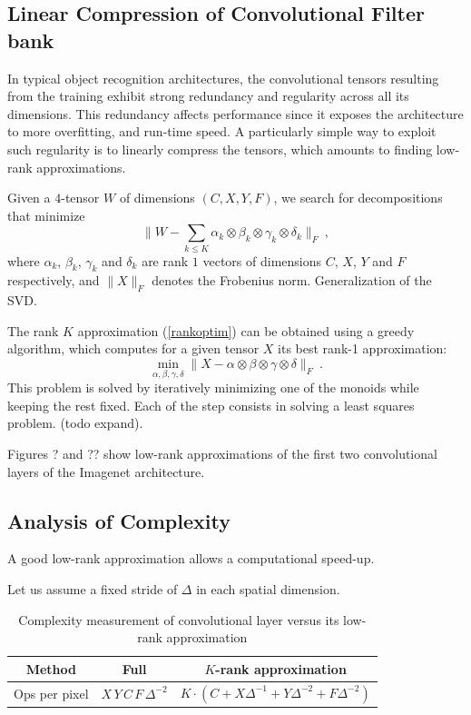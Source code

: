 \documentclass{article}
\begin{document}
\subsection{Linear Compression of Convolutional Filter bank}

In typical object recognition architectures, the convolutional tensors resulting
from the training exhibit strong redundancy and regularity across all its 
dimensions. This redundancy affects performance since it exposes
the architecture to more overfitting, and run-time speed. 
A particularly simple way to exploit such regularity is to 
linearly compress the tensors, which amounts to finding low-rank 
approximations.

Given a $4$-tensor $W$ of dimensions $(C,X,Y,F)$, we search for decompositions 
that minimize 
\begin{equation}
\label{rankoptim}
\| W - \sum_{k\leq K} \alpha_k \otimes \beta_k \otimes \gamma_k \otimes \delta_k\|_F~,
\end{equation}
where $\alpha_k$, $\beta_k$, $\gamma_k$ and $\delta_k$ are 
rank $1$ vectors of dimensions $C$, $X$, $Y$ and $F$ respectively, and
$\| X \|_F$ denotes the Frobenius norm. Generalization of the SVD.

The rank $K$ approximation (\ref{rankoptim}) can be obtained using a greedy 
algorithm, which computes for a given tensor $X$ its best rank-1 approximation:
\begin{equation}
\label{pla}
\min_{\alpha, \beta, \gamma, \delta} \| X - \alpha \otimes \beta \otimes \gamma \otimes \delta \|_F ~.
\end{equation}
This problem is solved by iteratively minimizing one of the monoids while keeping 
the rest fixed. Each of the step consists in solving a least squares problem. (todo expand).

Figures ? and ?? show low-rank approximations of the first two convolutional
layers of the Imagenet architecture.


\subsection{Analysis of Complexity}

A good low-rank approximation allows a computational speed-up. 

Let us assume a fixed stride of $\Delta$ in each spatial dimension. 

\begin{table}
\label{firsttable}
\caption{Complexity measurement 
of convolutional layer versus its low-rank approximation}
\centering
\begin{tabular}{|c| c c |}
\hline
Method & Full & $K$-rank approximation \\
\hline
Ops per pixel & $X\,Y\,C\,F\, \Delta^{-2}$ & $K \cdot ( C + X \Delta^{-1} + Y \Delta^{-2} + F \Delta^{-2})$ \\
\hline
\end{tabular}
\end{table}
\end{document}

